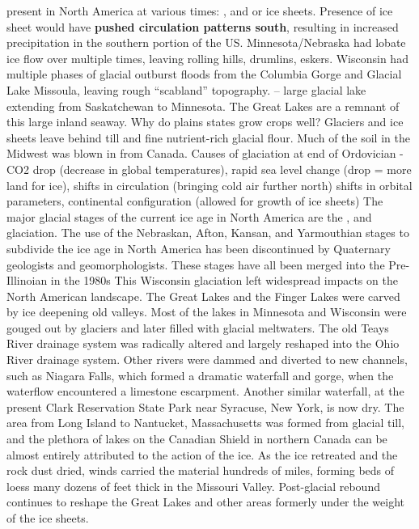 	present in North America at various times: ,  and  or  ice sheets. Presence of ice sheet would have \textbf{pushed circulation patterns south}, resulting in increased precipitation in the southern portion of the US. Minnesota/Nebraska had lobate ice flow over multiple times, leaving rolling hills, drumlins, eskers. Wisconsin had multiple phases of glacial outburst floods from the Columbia Gorge and Glacial Lake Missoula, leaving rough “scabland” topography. 
	 – large glacial lake extending from Saskatchewan to Minnesota. The Great Lakes are a remnant of this large inland seaway. Why do plains states grow crops well? Glaciers and ice sheets leave behind till and fine nutrient-rich glacial flour. Much of the soil in the Midwest was blown in from Canada. Causes of glaciation at end of Ordovician - CO2 drop (decrease in global temperatures), rapid sea level change (drop = more land for ice), shifts in circulation (bringing cold air further north) shifts in orbital parameters, continental configuration (allowed for growth of ice sheets) 
		The major glacial stages of the current ice age in North America are the ,  and  glaciation. The use of the Nebraskan, Afton, Kansan, and Yarmouthian stages to subdivide the ice age in North America has been discontinued by Quaternary geologists and geomorphologists. These stages have all been merged into the Pre-Illinoian in the 1980s
		This Wisconsin glaciation left widespread impacts on the North American landscape. The Great Lakes and the Finger Lakes were carved by ice deepening old valleys. Most of the lakes in Minnesota and Wisconsin were gouged out by glaciers and later filled with glacial meltwaters. The old Teays River drainage system was radically altered and largely reshaped into the Ohio River drainage system. Other rivers were dammed and diverted to new channels, such as Niagara Falls, which formed a dramatic waterfall and gorge, when the waterflow encountered a limestone escarpment. Another similar waterfall, at the present Clark Reservation State Park near Syracuse, New York, is now dry.
		The area from Long Island to Nantucket, Massachusetts was formed from glacial till, and the plethora of lakes on the Canadian Shield in northern Canada can be almost entirely attributed to the action of the ice. As the ice retreated and the rock dust dried, winds carried the material hundreds of miles, forming beds of loess many dozens of feet thick in the Missouri Valley. Post-glacial rebound continues to reshape the Great Lakes and other areas formerly under the weight of the ice sheets.
